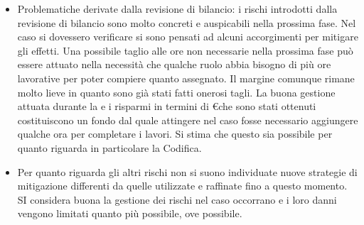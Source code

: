 \begin{itemize}
\item {Problematiche derivate dalla revisione di bilancio:} i rischi introdotti dalla revisione di bilancio sono molto concreti e auspicabili nella prossima fase. Nel caso si dovessero verificare si sono pensati ad alcuni accorgimenti per mitigare gli effetti. Una possibile taglio alle ore non necessarie nella prossima fase può essere attuato nella necessità che qualche ruolo abbia bisogno di più ore lavorative per poter compiere quanto assegnato. Il margine comunque rimane molto lieve in quanto sono già stati fatti onerosi tagli. La buona gestione attuata durante la \fC e i risparmi in termini di \euro che sono stati ottenuti costituiscono un fondo dal quale attingere nel caso fosse necessario aggiungere qualche ora per completare i lavori. Si stima che questo sia possibile per quanto riguarda in particolare la Codifica.
\item Per quanto riguarda gli altri rischi non si suono individuate nuove strategie di mitigazione differenti da quelle utilizzate e raffinate fino a questo momento. SI considera buona la gestione dei rischi nel caso occorrano e i loro danni vengono limitati quanto più possibile, ove possibile.
\end{itemize}
